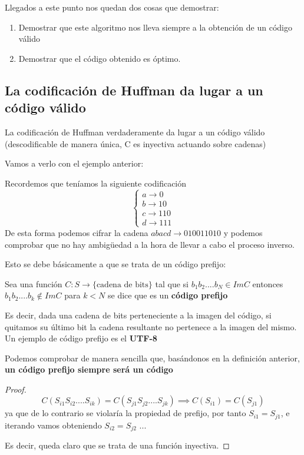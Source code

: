 Llegados a este punto nos quedan dos cosas que demostrar:
\begin{enumerate}
\item Demostrar que este algoritmo nos lleva siempre a la obtención de un código válido
\item Demostrar que el código obtenido es óptimo.
\end{enumerate}

\subsection{La codificación de Huffman da lugar a un código válido}

La codificación de Huffman verdaderamente da lugar a un código válido (descodificable de manera única, C es inyectiva actuando sobre cadenas)

Vamos a verlo con el ejemplo anterior:
\begin{example}
	Recordemos que teníamos la siguiente codificación
	 $$\begin{cases}
	 a \rightarrow 0 \\ b \rightarrow 10 \\ c \rightarrow 110\\ d \rightarrow 111
	 \end{cases}$$
	 De esta forma podemos cifrar la cadena $ abacd \rightarrow 010011010$ y podemos comprobar que no hay ambigüedad a la hora de llevar a cabo el proceso inverso.
\end{example}

Esto se debe básicamente a que se trata de un código prefijo:

\begin{defn}
	Sea una función $C : S \rightarrow \{ \text{cadena de bits}\}$ tal que si $b_1 b_2 .... b_N \in Im C$ entonces $b_1 b_2 .... b_k \notin Im C$ para $k < N$ se dice que es un \textbf{código prefijo}

	Es decir, dada una cadena de bits perteneciente a la imagen del código, si quitamos su último bit la cadena resultante no pertenece a la imagen del mismo. Un ejemplo de código prefijo es el \textbf{UTF-8}
\end{defn}


Podemos comprobar de manera sencilla que, basándonos en la definición anterior, \textbf{un código prefijo siempre será un código}
\begin{proof}
$$C (S_{i1} S_{i2} .... S_{ik}) = C(S_{j1} S_{j2} .... S_{jk}) \implies C(S_{i1}) = C(S_{j1})$$
ya que de lo contrario se violaría la propiedad de prefijo, por tanto $S_{i1} = S_{j1}$, e iterando vamos obteniendo $S_{i2} = S_{j2}$ ...

Es decir, queda claro que se trata de una función inyectiva.
\end{proof}


